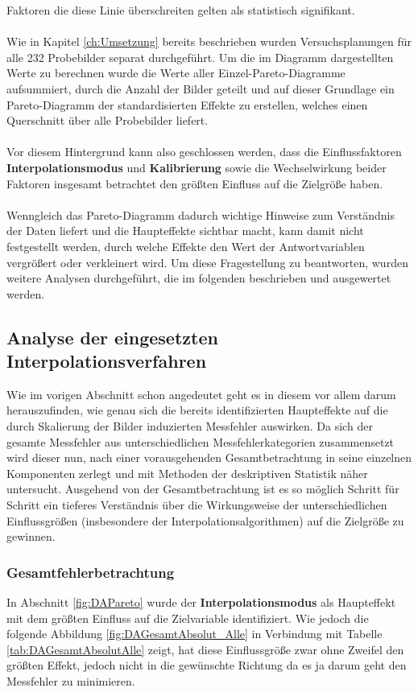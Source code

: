 \documentclass[
fontsize=10pt, 
listof = totoc,
parskip = half	
]{report}
\begin{document}
\noindent Faktoren die diese Linie überschreiten gelten als statistisch signifikant. 
\\\\
Wie in Kapitel \ref{ch:Umsetzung} bereits beschrieben wurden Versuchsplanungen für alle 232 Probebilder separat durchgeführt. Um die im Diagramm dargestellten Werte zu berechnen wurde die Werte aller Einzel-Pareto-Diagramme aufsummiert, durch die Anzahl der Bilder geteilt und auf dieser Grundlage ein Pareto-Diagramm der standardisierten Effekte zu erstellen, welches einen Querschnitt über  alle Probebilder liefert.
\\\\
\noindent Vor diesem Hintergrund kann also geschlossen werden, dass die Einflussfaktoren \textbf{Interpolationsmodus} und \textbf{Kalibrierung} sowie die Wechselwirkung beider Faktoren insgesamt betrachtet den größten Einfluss auf die Zielgröße haben.
\\\\
\noindent Wenngleich das Pareto-Diagramm dadurch wichtige Hinweise zum Verständnis der Daten liefert und die Haupteffekte sichtbar macht, kann damit nicht festgestellt werden, durch welche Effekte den Wert der Antwortvariablen vergrößert oder verkleinert wird. Um diese Fragestellung zu beantworten, wurden weitere Analysen durchgeführt, die im folgenden beschrieben und ausgewertet werden.


\subsection{Analyse der eingesetzten Interpolationsverfahren}

Wie im vorigen Abschnitt schon angedeutet geht es in diesem vor allem darum herauszufinden, wie genau sich die bereits identifizierten Haupteffekte auf die durch Skalierung der Bilder induzierten Messfehler auswirken. Da sich der gesamte Messfehler aus unterschiedlichen Messfehlerkategorien zusammensetzt wird dieser nun, nach einer vorausgehenden Gesamtbetrachtung in seine einzelnen Komponenten zerlegt und mit Methoden der deskriptiven Statistik näher untersucht. Ausgehend von der Gesamtbetrachtung ist es so möglich Schritt für Schritt ein tieferes Verständnis über die Wirkungsweise der unterschiedlichen Einflussgrößen (insbesondere der Interpolationsalgorithmen) auf die Zielgröße zu gewinnen.

\subsubsection{Gesamtfehlerbetrachtung}
\label{subsubsec:AuswertungGesamtfehlerbetrachtung}
 In Abschnitt \ref{fig:DAPareto} wurde der \textbf{Interpolationsmodus} als Haupteffekt mit dem größten Einfluss auf die Zielvariable identifiziert. Wie jedoch die folgende Abbildung \ref{fig:DAGesamtAbsolut_Alle} in Verbindung mit Tabelle \ref{tab:DAGesamtAbsolutAlle} zeigt, hat diese Einflussgröße zwar ohne Zweifel den größten Effekt, jedoch nicht in die gewünschte Richtung da es ja darum geht den Messfehler zu minimieren. 
\end{document}
